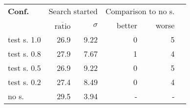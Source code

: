 \begin{tabular}{ l r r | r r r }
\hline 
\textbf{Conf.} & \multicolumn{2}{c|}{Search started} & \multicolumn{2}{c}{Comparison to no s.} \\ 
  & $\overline{\text{ratio}}$ & $\sigma$ & better & worse \\ 
\hline 
test s. 1.0 & 26.9 & 9.22 & 0 & 5 \\ 
test s. 0.8 & 27.9 & 7.67 & 1 & 4 \\ 
test s. 0.5 & 26.9 & 9.22 & 0 & 5 \\ 
test s. 0.2 & 27.4 & 8.49 & 0 & 4 \\ 
no s. & 29.5 & 3.94 & - & - \\ 
\hline 
\end{tabular}